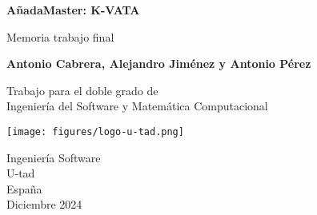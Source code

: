 \documentclass{report}
\begin{document}
\begin{titlepage}
    \begin{center}
        \vspace*{1cm}
 
        \Large\textbf{AñadaMaster: K-VATA}
 
        \vspace{0.5cm}
            Memoria trabajo final
        \vspace{1.5cm}
 
        \textbf{Antonio Cabrera, Alejandro Jiménez y Antonio Pérez}
 
        \vfill
             
        Trabajo para el doble grado de\\
        Ingeniería del Software y Matemática Computacional\\
             
        \vspace{0.8cm}
      
        \texttt{[image: figures/logo-u-tad.png]}
             
        Ingeniería Software\\
        U-tad\\
        España\\
        Diciembre 2024
             
    \end{center}
 \end{titlepage}

\tableofcontents

\listoffigures














\end{document}
